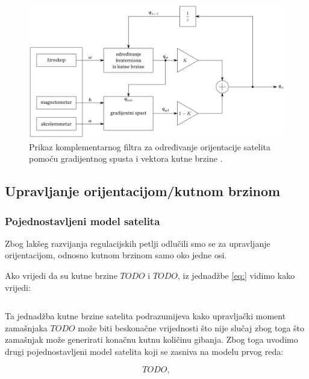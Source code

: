 \documentclass[times, utf8, diplomski, numeric]{templates/template}
\begin{document}
{{{{                \begin{figure}[htb]
                \centering
                \includegraphics[width=1.0\textwidth]{images/komp_filt_fig.png}
                \caption{Prikaz komplementarnog filtra za određivanje orijentacije satelita pomoću gradijentnog spusta i vektora kutne brzine \cite{uvod_u_svemirske}.}
                \label{fig:komp_filt_fig}
                \end{figure}
            }
        }

        \subsection{Upravljanje orijentacijom/kutnom brzinom}{
            \subsubsection{Pojednostavljeni model satelita}{
                Zbog lakšeg razvijanja regulacijskih petlji odlučili smo se za upravljanje orijentacijom, odnosno kutnom brzinom samo oko jedne osi. 

                Ako vrijedi da su kutne brzine $TODO$ i $TODO$, iz jednadžbe \ref{eq:} vidimo kako vrijedi:

                \begin{equation}
                \end{equation}

                Ta jednadžba kutne brzine satelita podrazumijeva kako upravljački moment zamašnjaka $TODO$ može biti beskonačne vrijednosti što nije slučaj zbog toga što zamašnjak može generirati konačnu kutnu količinu gibanja. Zbog toga uvodimo drugi pojednostavljeni model satelita koji se zasniva na modelu prvog reda:

                \begin{equation}
                    TODO,
                \end{equation}

}}}}
\end{document}

